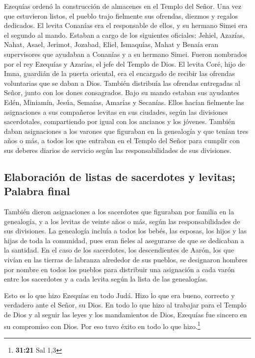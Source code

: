  Ezequías ordenó la construcción de almacenes en el
Templo del Señor. Una vez que estuvieron listos,  el
pueblo trajo fielmente sus ofrendas, diezmos y regalos dedicados. El
levita Conanías era el responsable de ellos, y su hermano Simei era el
segundo al mando.  Estaban a cargo de los siguientes
oficiales: Jehiel, Azazías, Nahat, Asael, Jerimot, Jozabad, Eliel,
Ismaquías, Mahat y Benaía eran supervisores que ayudaban a Conanías y a
su hermano Simei. Fueron nombrados por el rey Ezequías y Azarías, el
jefe del Templo de Dios.  El levita Coré, hijo de Imna,
guardián de la puerta oriental, era el encargado de recibir las ofrendas
voluntarias que se daban a Dios. También distribuía las ofrendas
entregadas al Señor, junto con los dones consagrados. 
Bajo su mando estaban sus ayudantes Edén, Miniamín, Jesúa, Semaías,
Amarías y Secanías. Ellos hacían fielmente las asignaciones a sus
compañeros levitas en sus ciudades, según las divisiones sacerdotales,
compartiendo por igual con los ancianos y los jóvenes. 
También daban asignaciones a los varones que figuraban en la genealogía
y que tenían tres años o más, a todos los que entraban en el Templo del
Señor para cumplir con sus deberes diarios de servicio según las
responsabilidades de sus divisiones.

\hypertarget{elaboraciuxf3n-de-listas-de-sacerdotes-y-levitas-palabra-final}{%
\subsection{Elaboración de listas de sacerdotes y levitas; Palabra
final}\label{elaboraciuxf3n-de-listas-de-sacerdotes-y-levitas-palabra-final}}

 También dieron asignaciones a los sacerdotes que
figuraban por familia en la genealogía, y a los levitas de veinte años o
más, según las responsabilidades de sus divisiones.  La
genealogía incluía a todos los bebés, las esposas, los hijos y las hijas
de toda la comunidad, pues eran fieles al asegurarse de que se dedicaban
a la santidad.  En el caso de los sacerdotes, los
descendientes de Aarón, los que vivían en las tierras de labranza
alrededor de sus pueblos, se designaron hombres por nombre en todos los
pueblos para distribuir una asignación a cada varón entre los sacerdotes
y a cada levita según la lista de las genealogías.

 Esto es lo que hizo Ezequías en todo Judá. Hizo lo que
era bueno, correcto y verdadero ante el Señor, su Dios. 
En todo lo que hizo al trabajar para el Templo de Dios y al seguir las
leyes y los mandamientos de Dios, Ezequías fue sincero en su compromiso
con Dios. Por eso tuvo éxito en todo lo que hizo.\footnote{\textbf{31:21}
  Sal 1,3}

